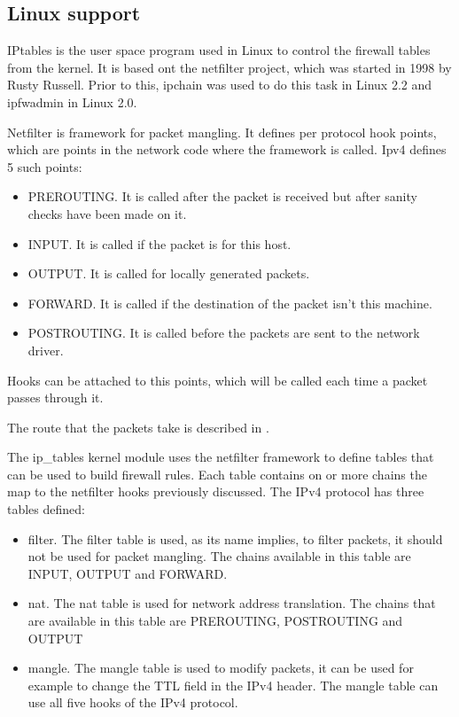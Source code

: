\subsection{Linux support}
\label{sub-sec:firewall-lin}

IPtables is the user space program used in Linux to control the firewall tables from the kernel. It is based
ont the netfilter project, which was started in 1998 by Rusty Russell. Prior to this, ipchain was used to do
this task in Linux 2.2 and ipfwadmin in Linux 2.0.

Netfilter is framework for packet mangling. It defines per protocol hook points, which are points in the network code
where the framework is called. Ipv4 defines 5 such points:
\begin{itemize}
  \item PREROUTING. It is called after the packet is received but after sanity checks have been made on it.
  \item INPUT. It is called if the packet is for this host.
  \item OUTPUT.	It is called for locally generated packets.
  \item FORWARD. It is called if the destination of the packet isn't this machine.
  \item POSTROUTING. It is called before the packets are sent to the network driver.
\end{itemize}
Hooks can be attached to this points, which will be called each time a packet passes through it.

The route that the packets take is described in .

The ip_tables kernel module uses the netfilter framework to define tables that can be used to build firewall rules.
Each table contains on or more chains the map to the netfilter hooks previously discussed. 
The IPv4 protocol has three tables defined:
\begin{itemize}
  \item filter. The filter table is used, as its name implies, to filter packets, it should not be used for packet mangling. The chains
available in this table are INPUT, OUTPUT and FORWARD.
  \item nat. The nat table is used for network address translation. The chains that are available in this table are PREROUTING,
 POSTROUTING and OUTPUT
  \item mangle. The mangle table is used to modify packets, it can be used for example to change the TTL field in
the IPv4 header. The mangle table can use all five hooks of the IPv4 protocol.
\end{itemize}

